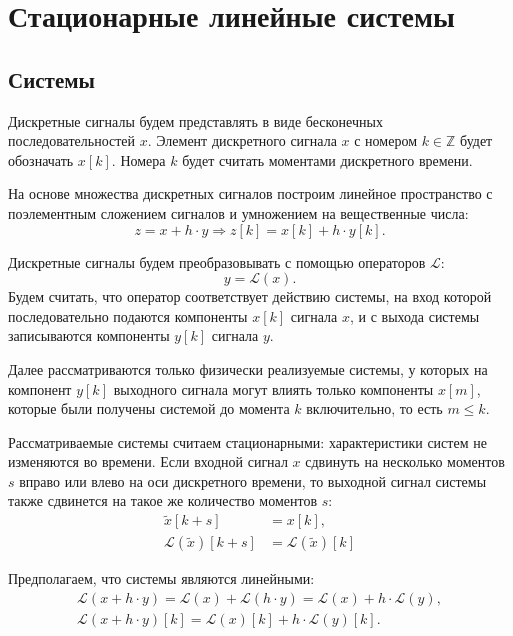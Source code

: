 \chapter{Стационарные линейные системы}


\section{Системы}

Дискретные сигналы будем представлять в виде бесконечных последовательностей $x$. Элемент дискретного сигнала $x$ с номером $k \in \mathbb{Z}$ будет обозначать $x[k]$.
Номера $k$ будет считать моментами дискретного времени.

На основе множества дискретных сигналов построим линейное пространство с поэлементным сложением сигналов и умножением на вещественные числа:
\[
    z = x + h \cdot y \Rightarrow z[k] = x[k] + h \cdot y[k].
\]

Дискретные сигналы будем преобразовывать с помощью операторов $\mathcal{L}$:
\[
    y = \mathcal{L}(x).
\]
Будем считать, что оператор соответствует действию системы, на вход которой последовательно подаются компоненты $x[k]$ сигнала $x$, и с выхода системы записываются компоненты
$y[k]$ сигнала $y$.

Далее рассматриваются только физически реализуемые системы, у которых на компонент $y[k]$ выходного сигнала могут влиять только компоненты $x[m]$, которые были получены системой
до момента $k$ включительно, то есть $m \le k$.

Рассматриваемые системы считаем стационарными: характеристики систем не изменяются во времени. Если входной сигнал $x$ сдвинуть на несколько моментов $s$ вправо или влево
на оси дискретного времени, то выходной сигнал системы также сдвинется на такое же количество моментов $s$:
\begin{align*}
    \widetilde{x}[k+s]              & = x[k] ,                        \\
    \mathcal{L}(\widetilde{x})[k+s] & = \mathcal{L}(\widetilde{x})[k]
\end{align*}

Предполагаем, что системы являются линейными:
\begin{gather*}
    \mathcal{L}(x + h \cdot y)
    = \mathcal{L}(x) + \mathcal{L}(h \cdot y)
    = \mathcal{L}(x) + h \cdot \mathcal{L}(y) , \\
    \mathcal{L}(x + h \cdot y)[k]
    = \mathcal{L}(x)[k] + h \cdot \mathcal{L}(y)[k] .
\end{gather*}

